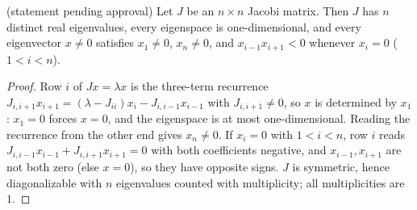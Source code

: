 \begin{theorem}
  \label{thm:jacobi_simple}
  (statement pending approval)
  Let $J$ be an $n\times n$ Jacobi matrix. Then $J$ has $n$ distinct real eigenvalues, every eigenspace is
  one-dimensional, and every eigenvector $x\ne0$ satisfies $x_1\ne0$, $x_n\ne0$, and $x_{i-1}x_{i+1}<0$ whenever
  $x_i=0$ ($1<i<n$).
\end{theorem}
\begin{proof}
  Row $i$ of $Jx=\lambda x$ is the three-term recurrence
  $J_{i,i+1}x_{i+1}=(\lambda-J_{ii})x_i-J_{i,i-1}x_{i-1}$ with $J_{i,i+1}\ne0$, so $x$ is determined by $x_1$:
  $x_1=0$ forces $x=0$, and the eigenspace is at most one-dimensional. Reading the recurrence from the other end
  gives $x_n\ne0$. If $x_i=0$ with $1<i<n$, row $i$ reads $J_{i,i-1}x_{i-1}+J_{i,i+1}x_{i+1}=0$ with both coefficients
  negative, and $x_{i-1},x_{i+1}$ are not both zero (else $x=0$), so they have opposite signs. $J$ is symmetric, hence
  diagonalizable with $n$ eigenvalues counted with multiplicity; all multiplicities are $1$.
\end{proof}

